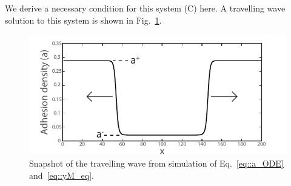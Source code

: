 We derive a necessary condition for this system (C) here. A travelling wave solution to this system is shown in Fig.~\ref{fig::A_wave}.
\begin{figure}[h]
\centering
\captionsetup{width=.9\linewidth}
\includegraphics[width=4.5in]{Project2/figs/A_wave.pdf}
\caption{Snapshot of the travelling wave from simulation of Eq.~\ref{eq::a_ODE} and~\ref{eq::yM_eq}.}
\label{fig::A_wave}
\end{figure}

